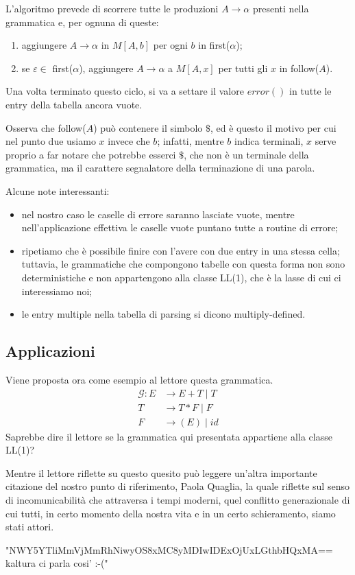 \documentclass[class=book, crop=false, oneside, 12pt]{standalone}
\begin{document}
L'algoritmo prevede di scorrere tutte le produzioni \(A \to \alpha\) presenti nella grammatica e, per ognuna di queste:
\begin{enumerate}
    \item aggiungere \(A \to \alpha\) in \(M[A, b]\) per ogni \(b\) in first(\(\alpha\));
    \item se  \(\varepsilon \in\) first(\(\alpha\)), aggiungere \(A \to \alpha\) a \(M[A, x]\) per tutti gli \(x\) in follow(\(A\)). 
\end{enumerate}
Una volta terminato questo ciclo, si va a settare il valore \(error()\) in tutte le entry della tabella ancora vuote.

Osserva che follow(\(A\)) può contenere il simbolo \(\$\), ed è questo il motivo per cui nel punto due usiamo \(x\) invece che \(b\); infatti, mentre \(b\) indica terminali, \(x\) serve proprio a far notare che potrebbe esserci \(\$\), che non è un terminale della grammatica, ma il carattere segnalatore della terminazione di una parola.

Alcune note interessanti:
\begin{itemize}
    \item nel nostro caso le caselle di errore saranno lasciate vuote, mentre nell’applicazione effettiva le caselle vuote puntano tutte a routine di errore;
    \item ripetiamo che è possibile finire con l'avere con due entry in una stessa cella; tuttavia, le grammatiche che compongono tabelle con questa forma non sono deterministiche e non appartengono alla classe LL(1), che è la lasse di cui ci interessiamo noi;
    \item le entry multiple nella tabella di parsing si dicono multiply-defined.
\end{itemize}

\subsection{Applicazioni}
Viene proposta ora come esempio al lettore questa grammatica.
\begin{align*}
    \label{non-ll1_grammar}
    \mathcal{G}: E &\to E+T \mid T \\
    T &\to T*F \mid F \nonumber \\
    F &\to (E) \mid id \nonumber 
\end{align*}
Saprebbe dire il lettore se la grammatica qui presentata appartiene alla classe LL(1)?

Mentre il lettore riflette su questo quesito può leggere un'altra importante citazione del nostro punto di riferimento, Paola Quaglia, la quale riflette sul senso di incomunicabilità che attraversa i tempi moderni, quel conflitto generazionale di cui tutti, in certo momento della nostra vita e in un certo schieramento, siamo stati attori.
\begin{displayquote}
    "NWY5YTliMmVjMmRhNiwyOS8xMC8yMDIwIDExOjUxLGthbHQxMA==  kaltura ci parla cosi' :-("
\end{displayquote}
\end{document}
